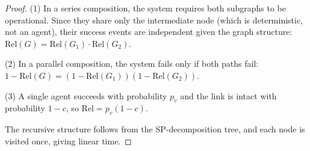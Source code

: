 \begin{proof}
(1) In a series composition, the system requires both subgraphs to be operational.
Since they share only the intermediate node (which is deterministic, not an agent),
their success events are independent given the graph structure:
$\mathrm{Rel}(G) = \mathrm{Rel}(G_1) \cdot \mathrm{Rel}(G_2)$.

(2) In a parallel composition, the system fails only if both paths fail:
$1 - \mathrm{Rel}(G) = (1 - \mathrm{Rel}(G_1))(1 - \mathrm{Rel}(G_2))$.

(3) A single agent succeeds with probability $p_v$ and the link is intact with
probability $1-c$, so $\mathrm{Rel} = p_v(1-c)$.

The recursive structure follows from the SP-decomposition tree, and each node is
visited once, giving linear time.
\end{proof}

